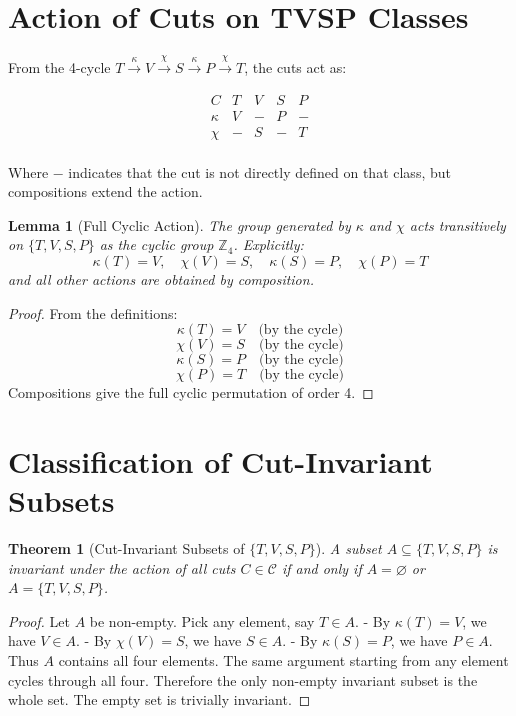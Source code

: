 \documentclass[12pt]{article}
\newtheorem{theorem}[axiom]{Theorem}
\newtheorem{lemma}[axiom]{Lemma}
\begin{document}
\section{Action of Cuts on TVSP Classes}

From the 4-cycle \(T \xrightarrow{\kappa} V \xrightarrow{\chi} S \xrightarrow{\kappa} P \xrightarrow{\chi} T\), the cuts act as:

\[
\begin{array}{c|cccc}
C & T & V & S & P \\
\hline
\kappa & V & - & P & - \\
\chi & - & S & - & T \\
\end{array}
\]

Where \(-\) indicates that the cut is not directly defined on that class, but compositions extend the action.

\begin{lemma}[Full Cyclic Action]
The group generated by \(\kappa\) and \(\chi\) acts transitively on \(\{T, V, S, P\}\) as the cyclic group \(\mathbb{Z}_4\). Explicitly:
\[
\kappa(T) = V,\quad \chi(V) = S,\quad \kappa(S) = P,\quad \chi(P) = T
\]
and all other actions are obtained by composition.
\end{lemma}

\begin{proof}
From the definitions:
\[
\kappa(T) = V \quad \text{(by the cycle)}
\]
\[
\chi(V) = S \quad \text{(by the cycle)}
\]
\[
\kappa(S) = P \quad \text{(by the cycle)}
\]
\[
\chi(P) = T \quad \text{(by the cycle)}
\]
Compositions give the full cyclic permutation of order 4.
\end{proof}

\section{Classification of Cut-Invariant Subsets}

\begin{theorem}[Cut-Invariant Subsets of \(\{T, V, S, P\}\)]
A subset \(A \subseteq \{T, V, S, P\}\) is invariant under the action of all cuts \(C \in \mathcal{C}\) if and only if \(A = \varnothing\) or \(A = \{T, V, S, P\}\).
\end{theorem}

\begin{proof}
Let \(A\) be non-empty. Pick any element, say \(T \in A\).
- By \(\kappa(T) = V\), we have \(V \in A\).
- By \(\chi(V) = S\), we have \(S \in A\).
- By \(\kappa(S) = P\), we have \(P \in A\).
Thus \(A\) contains all four elements.
The same argument starting from any element cycles through all four.
Therefore the only non-empty invariant subset is the whole set.
The empty set is trivially invariant.
\end{proof}
\end{document}
